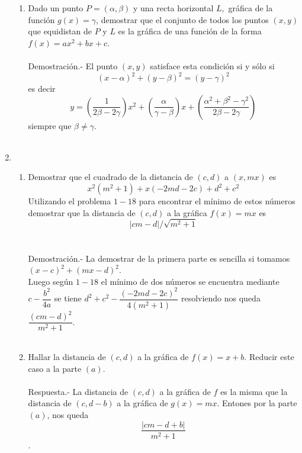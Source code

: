 \begin{enumerate}[\bfseries 1.]
\begin{enumerate}[\bfseries (a)]
	\item Dado un punto $P=(\alpha,\beta)$ y una recta horizontal $L,$ gráfica de la función $g(x)=\gamma$, demostrar que el conjunto de todos los puntos $(x,y)$ que equidistan de $P$ y $L$ es la gráfica de una función de la forma $f(x)=ax^2 + bx + c$.\\\\
	Demostración.-\; El punto $(x,y)$ satisface esta condición si y sólo si $$(x-\alpha)^2 + (y-\beta)^2 = (y-\gamma)^2$$ es decir $$y=\left(\dfrac{1}{2\beta - 2 \gamma}\right)x^2 + \left(\dfrac{\alpha}{\gamma - \beta}\right) x + \left(\dfrac{\alpha^2 + \beta^2 - \gamma^2}{2\beta - 2\gamma}\right)$$ siempre que $\beta \neq \gamma$.\\\\

    \end{enumerate}

    \item 
    \begin{enumerate}[\bfseries (a)]
	
	\item Demostrar que el cuadrado de la distancia de $(c,d)$ a $(x,mx)$ es $$x^2(m^2+1)+x(-2md-2c)+d^2+c^2$$ Utilizando el problema $1-18$ para encontrar el mínimo de estos números demostrar que la distancia de $(c,d)$ a la gráfica $f(x)=mx$ es $$|cm-d|/\sqrt{m^2+1}$$\\\\
	    Demostración.-\; La demostrar de la primera parte es sencilla si tomamos $(x-c)^2+(mx-d)^2$.\\
	    Luego según $1-18$ el mínimo de dos números se encuentra mediante $c-\dfrac{b^2}{4a}$ se tiene $d^2 + c^2 - \dfrac{(-2md-2c)^2}{4(m^2+1)}$ resolviendo nos queda $\dfrac{(cm-d)^2}{m^2+1}$.\\\\

	\item Hallar la distancia de $(c,d)$ a la gráfica de $f(x)=x+b$. Reducir este caso a la parte $(a)$.\\\\
	    Respuesta.-\; La distancia de $(c,d)$ a la gráfica de $f$ es la misma que la distancia de $(c,d-b)$ a la gráfica de $g(x)=mx$. Entones por la parte $(a)$, nos queda $$\dfrac{|cm-d+b|}{m^2+1}$$.\\\\
    \end{enumerate}


\end{enumerate}
